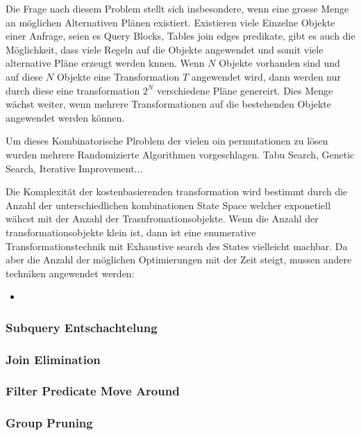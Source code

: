 Die Frage nach diesem Problem stellt sich insbesondere, wenn eine grosse Menge an möglichen Alternativen Plänen existiert. Existieren viele Einzelne Objekte einer Anfrage, seien es Query Blocks, Tables join edges predikate, gibt es auch die Möglichkeit, dass viele Regeln auf die Objekte angewendet und somit viele alternative Pläne erzeugt werden knnen. Wenn $N$ Objekte vorhanden sind und auf diese $N$ Objekte eine Transformation $T$ angewendet wird, dann werden nur durch diese eine transformation $2^N$ verschiedene Pläne genereirt. Dies Menge wächst weiter, wenn mehrere Transformationen auf die bestehenden Objekte angewendet werden können. 


Um dieses Kombinatorische Plroblem der vielen oin permutationen zu lösen wurden mehrere Randomizierte Algorithmen vorgeschlagen. Tabu Search, Genetic Search, Iterative Improvement...


Die Komplexität der kostenbasierenden transformation wird bestimmt durch die Anzahl der unterschiedlichen kombinationen State Space welcher exponetiell wähcst mit der Anzahl der Trasnfromationsobjekte. Wenn die Anzahl der transformationsobjekte klein ist, dann ist eine enumerative Transformationstechnik mit Exhaustive search des States vielleicht machbar. Da aber die Anzahl der möglichen Optimierungen mit der Zeit steigt, mussen andere techniken angewendet werden:

\begin{itemize}
\item 
\end{itemize}

\subsubsection{Subquery Entschachtelung}

\subsubsection{Join Elimination}

\subsubsection{Filter Predicate Move Around}

\subsubsection{Group Pruning}
